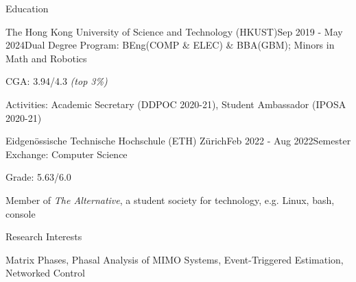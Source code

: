 \documentclass{resume}
\begin{document}
\begin{rSection}{Education}

    \begin{rSubsection}{The Hong Kong University of Science and Technology (HKUST)}{Sep 2019 - May 2024}{Dual Degree Program: BEng(COMP \& ELEC) \& BBA(GBM); Minors in Math and Robotics}{}
        \item CGA: 3.94/4.3 \emph{(top 3\%)}
        \item Activities: Academic Secretary (DDPOC 2020-21), Student Ambassador (IPOSA 2020-21)
    \end{rSubsection}
    
    \begin{rSubsection}{Eidgenössische Technische Hochschule (ETH) Zürich}{Feb 2022 - Aug 2022}{Semester Exchange: Computer Science}{}
        \item Grade: 5.63/6.0
        \item Member of \emph{The Alternative}, a student society for technology, e.g. Linux, bash, console
    \end{rSubsection}

\end{rSection}

\begin{rSection}{Research Interests}

    Matrix Phases, Phasal Analysis of MIMO Systems, Event-Triggered Estimation, Networked Control

\end{rSection}
\end{document}

